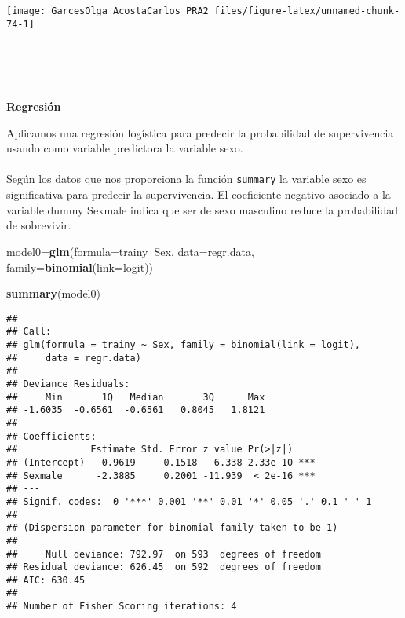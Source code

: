 \documentclass[
]{article}
\newenvironment{Shaded}{\begin{snugshade}}{\end{snugshade}}
\newcommand{\DataTypeTok}[1]{\textcolor[rgb]{0.13,0.29,0.53}{#1}}
\newcommand{\KeywordTok}[1]{\textcolor[rgb]{0.13,0.29,0.53}{\textbf{#1}}}
\newcommand{\NormalTok}[1]{#1}
\newcommand{\OperatorTok}[1]{\textcolor[rgb]{0.81,0.36,0.00}{\textbf{#1}}}
\begin{document}
\begin{center}\texttt{[image: GarcesOlga\_AcostaCarlos\_PRA2\_files/figure-latex/unnamed-chunk-74-1]} \end{center}

\texttt{}\\
\texttt{}

\texttt{}~\\
\texttt{}~\\
\textbf{Regresión}

\texttt{}

Aplicamos una regresión logística para predecir la probabilidad de
supervivencia usando como variable predictora la variable sexo.\\
\texttt{}~\\
Según los datos que nos proporciona la función \texttt{summary} la
variable sexo es significativa para predecir la supervivencia. El
coeficiente negativo asociado a la variable dummy Sexmale indica que ser
de sexo masculino reduce la probabilidad de sobrevivir.

\texttt{}

\begin{Shaded}
\begin{Highlighting}[]
\NormalTok{model0=}\KeywordTok{glm}\NormalTok{(}\DataTypeTok{formula=}\NormalTok{trainy}\OperatorTok{~}\NormalTok{Sex, }\DataTypeTok{data=}\NormalTok{regr.data, }\DataTypeTok{family=}\KeywordTok{binomial}\NormalTok{(}\DataTypeTok{link=}\NormalTok{logit))}

\KeywordTok{summary}\NormalTok{(model0)}
\end{Highlighting}
\end{Shaded}

\begin{verbatim}
## 
## Call:
## glm(formula = trainy ~ Sex, family = binomial(link = logit), 
##     data = regr.data)
## 
## Deviance Residuals: 
##     Min       1Q   Median       3Q      Max  
## -1.6035  -0.6561  -0.6561   0.8045   1.8121  
## 
## Coefficients:
##             Estimate Std. Error z value Pr(>|z|)    
## (Intercept)   0.9619     0.1518   6.338 2.33e-10 ***
## Sexmale      -2.3885     0.2001 -11.939  < 2e-16 ***
## ---
## Signif. codes:  0 '***' 0.001 '**' 0.01 '*' 0.05 '.' 0.1 ' ' 1
## 
## (Dispersion parameter for binomial family taken to be 1)
## 
##     Null deviance: 792.97  on 593  degrees of freedom
## Residual deviance: 626.45  on 592  degrees of freedom
## AIC: 630.45
## 
## Number of Fisher Scoring iterations: 4
\end{verbatim}
\end{document}
